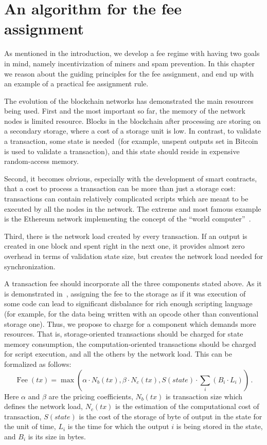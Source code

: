 \documentclass[]{llncs}   %
\begin{document}
\section{An algorithm for the fee assignment}
\label{sec:algorithm}

As mentioned in the introduction, we develop a fee regime with having two goals
in mind, namely incentivization of miners and spam prevention.  In this chapter
we reason about the guiding  principles for the fee assignment, and end up with
an example of a practical fee assignment rule.

The evolution of the blockchain networks has demonstrated the main resources
being used. First and the most important so far, the memory of the network nodes 
is limited resource. Blocks in the blockchain after processing are storing on a 
secondary storage, where a cost of a storage unit is low. In contrast, to validate a 
transaction, some state is needed~(for example, unspent outputs set in Bitcoin is used 
to validate a transaction), and this state should reside in expensive random-access memory.   

Second, it becomes obvious, especially with the development of smart contracts,
that a cost to process a transaction can be more than just a storage cost:
transactions can contain relatively complicated scripts which are meant to be
executed by all the nodes in the network. The extreme and most famous example is
the Ethereum network implementing the concept of the ``world computer''~\cite{ethyp}. 

Third, there is the network load created by every transaction. If an output is
created in one block and spent right in the next one, it provides almost zero
overhead in terms of validation state size, but creates the network load needed
for synchronization.

A transaction fee should incorporate all the three components stated above.  As
it is demonstrated in~\cite{Earlz2017}, assigning the fee to the storage as if
it was execution of some code can lead to significant disbalance for rich enough
scripting language (for example, for the data being written with an opcode other
than conventional storage one).  Thus, we propose to charge for a component
which demands more resources. That is, storage-oriented transactions should be
charged for state memory consumption, the computation-oriented transactions
should be charged for script execution, and all the others by the network load.
This can be formalized as follows:
\begin{equation}
    \operatorname{Fee}(tx) = \max\left(\alpha \cdot N_b(tx), \beta \cdot N_c(tx),
    S(state) \cdot \sum_i (B_i \cdot L_i) \right)\,.
    \label{eq:max}
\end{equation}
Here $\alpha$ and $\beta$ are the pricing coefficients, $N_b(tx)$ is transaction size 
which defines the network load, $N_c(tx)$ is the estimation of the computational 
cost of transaction, $S(state)$ is the cost of the storage of byte of output in the 
state for the unit of time, $L_i$ is the time for which the output $i$ is being stored 
in the state, and $B_i$ is its size in bytes.
\end{document}

